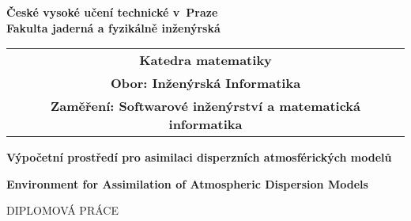 \newcommand{\cvut}{České vysoké učení technické v~Praze}
\newcommand{\fjfi}{Fakulta jaderná a fyzikálně inženýrská}
\newcommand{\km}{Katedra matematiky}
\newcommand{\obor}{Inženýrská Informatika}
\newcommand{\zamereni}{Softwarové inženýrství a matematická informatika}

\newcommand{\nazevcz}{Výpočetní prostředí pro asimilaci disperzních atmosférických modelů}
\newcommand{\nazeven}{Environment for Assimilation of Atmospheric Dispersion Models}
\newcommand{\autor}{Matěj Laitl}
\newcommand{\rok}{2014}
\newcommand{\vedouci}{Ing. Václav Šmídl, Ph.D.}

\newcommand{\pracovisteVed}{Oddělení adaptivních systémů \\
	Ústav teorie informace a automatizace \\
	Akademie věd České republiky}
\newcommand{\konzultant}{TODO}
\newcommand{\pracovisteKonz}{TODO: Oddělení adaptivních systémů \\
	Ústav teorie informace a automatizace \\
	Akademie věd České republiky}

\newcommand{\klicova}{TODO asimilace, Bayesovská filtrace, sekvenční Monte Carlo, radioaktivní únik}
\newcommand{\keyword}{TODO assimilation, Bayesian estimation, sequential Monte Carlo, radioactive
release}
\newcommand{\abstrCZ}{TODO.}
\newcommand{\abstrEN}{TODO.}


\thispagestyle{empty}

\begin{center}
	{\Large  \bf  \cvut\\[2mm] \fjfi }
	\vspace{10mm}

	\begin{tabular}{c}
	{\bf \km}\\
	{\bf Obor: \obor}\\
	{\bf Zaměření: \zamereni}
	\end{tabular}

	\vspace{10mm} \epsfysize=20mm   \vspace{15mm}

	{\LARGE
	\textbf{\nazevcz}
	\par}

	\vspace{5mm}

	{\LARGE
	\textbf{\nazeven}
	\par}

	\vspace{30mm}
	{\Large DIPLOMOVÁ PRÁCE}

\end{center}

